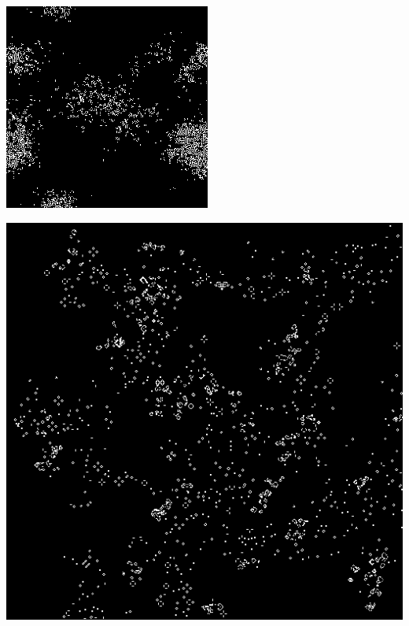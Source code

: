 \documentclass[11pt, oneside]{article}
\newenvironment{Figure}
  {\par\medskip\noindent\minipage{\linewidth}}
  {\endminipage\par\medskip}
\begin{document}
\begin{multicols}{3}
\begin{Figure}
\includegraphics[width=\linewidth]{images/256x256_2.png}
\end{Figure}


\begin{Figure}
\includegraphics[width=\linewidth]{images/512x512_2.png}
\end{Figure}

\end{multicols}
\end{document}
